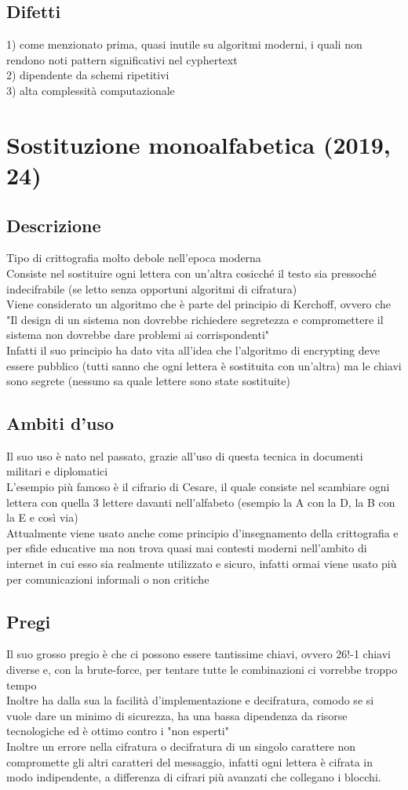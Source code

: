 \documentclass[10pt,oneside,a4paper]{article}
\begin{document}
\subsection{Difetti}
1) come menzionato prima, quasi inutile su algoritmi moderni, i quali non rendono noti pattern significativi nel cyphertext\\
2) dipendente da schemi ripetitivi\\
3) alta complessità computazionale
\section{Sostituzione monoalfabetica (2019, 24)}
\subsection{Descrizione}
Tipo di crittografia molto debole nell'epoca moderna\\
Consiste nel sostituire ogni lettera con un'altra cosicché il testo sia pressoché indecifrabile (se letto senza opportuni algoritmi di cifratura)\\
Viene considerato un algoritmo che è parte del principio di Kerchoff, ovvero che "Il design di un sistema non dovrebbe richiedere segretezza e compromettere il sistema non dovrebbe dare problemi ai corrispondenti"\\
Infatti il suo principio ha dato vita all'idea che l'algoritmo di encrypting deve essere pubblico (tutti sanno che ogni lettera è sostituita con un'altra) ma le chiavi sono segrete (nessuno sa quale lettere sono state sostituite)
\subsection{Ambiti d'uso}
Il suo uso è nato nel passato, grazie all'uso di questa tecnica in documenti militari e diplomatici\\
L'esempio più famoso è il cifrario di Cesare, il quale consiste nel scambiare ogni lettera con quella 3 lettere davanti nell'alfabeto (esempio la A con la D, la B con la E e così via)\\
Attualmente viene usato anche come principio d'insegnamento della crittografia e per sfide educative ma non trova quasi mai contesti moderni nell'ambito di internet in cui esso sia realmente utilizzato e sicuro, infatti ormai viene usato più per comunicazioni informali o non critiche
\subsection{Pregi}
Il suo grosso pregio è che ci possono essere tantissime chiavi, ovvero 26!-1 chiavi diverse e, con la brute-force, per tentare tutte le combinazioni ci vorrebbe troppo tempo\\
Inoltre ha dalla sua la facilità d'implementazione e decifratura, comodo se si vuole dare un minimo di sicurezza, ha una bassa dipendenza da risorse tecnologiche ed è ottimo contro i "non esperti"\\
Inoltre un errore nella cifratura o decifratura di un singolo carattere non compromette gli altri caratteri del messaggio, infatti ogni lettera è cifrata in modo indipendente, a differenza di cifrari più avanzati che collegano i blocchi.
\end{document}
